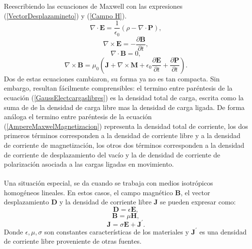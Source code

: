 \documentclass[11pt,fleqn]{book} %
\begin{document}
Reescribiendo las ecuaciones de Maxwell con las expresiones (\ref{VectorDesplazamineto}) y (\ref{Campo H}).
\begin{equation}
\nabla \cdot \textbf{E}=\frac{1}{\epsilon_{0}}(\rho-\nabla\cdot\textbf{P}), \label{GaussElectcargaslibres}
 \end{equation}
 \begin{equation}
 \nabla \times \textbf{E}=-\frac{\partial \textbf{B}}{\partial t},
 \end{equation}
 \begin{equation}
 \nabla \cdot \textbf{B}=0,
 \end{equation}
 \begin{equation}
\nabla \times \textbf{B}=\mu_{0}\left( \textbf{J}+\nabla \times \textbf{M}+\epsilon_{0}\frac{\partial \textbf{E}}{\partial t}+\frac{\partial \textbf{P}}{\partial t}\right). \label{AmpereMaxwelMagnetizacion}
 \end{equation}
Dos de estas ecuaciones cambiaron, su forma ya no es tan compacta. Sin embargo, resultan f\'acilmente comprensibles: el termino entre par\'entesis de la ecuaci\'on (\ref{GaussElectcargaslibres}) es la densidad total de carga, escrita como la suma de de la densidad de carga libre mas la densidad de carga ligada. De forma an\'aloga el termino entre par\'entesis de la ecuaci\'on (\ref{AmpereMaxwelMagnetizacion}) representa la densidad total de corriente, los dos primeros t\'erminos corresponden a la densidad de corriente libre y a la densidad de corriente de magnetizaci\'on, los otros dos t\'erminos corresponden a la densidad de corriente de desplazamiento del vac\'io y la de densidad de corriente de polarizaci\'on  asociada a las cargas ligadas en movimiento.\\\\
Una situaci\'on especial, se da cuando se trabaja con medios isotr\'opicos homog\'eneos lineales. En estos casos, el campo magn\'etico $\textbf{B}$, el vector desplazamiento $\textbf{D}$ y la densidad de corriente libre $\textbf{J}$ se pueden expresar como:\
\begin{equation}
\textbf{D}=\epsilon\textbf{E},
\end{equation}
\begin{equation}
\textbf{B}=\mu \textbf{H},
\end{equation}
\begin{equation}
\textbf{J}=\sigma\textbf{E}+\textbf{J}^{'}.
\end{equation}
Donde $\epsilon,\mu,\sigma$ son constantes caracter\'isticas de los materiales y $\textbf{J}^{'}$ es una densidad de corriente libre proveniente de otras fuentes.
\end{document}
